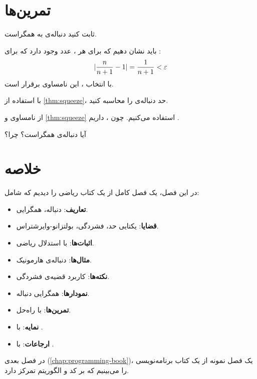 \section{تمرین‌ها}
\label{sec:math-book-exercises}

\begin{exercise}
    ثابت کنید دنباله‌ی 
    به  همگراست.
    \label{exc:convergence-n-over-n1}
\end{exercise}

\begin{solution}
    باید نشان دهیم که برای هر
    ، عدد 
    وجود دارد که برای :
    \[
        \lvert\frac{n}{n+1} - 1\rvert = \frac{1}{n+1} < \varepsilon
    \]
    با انتخاب ،
    این نامساوی برقرار است.
\end{solution}

\begin{exercise}
    با استفاده از \cref{thm:squeeze}، حد
    دنباله‌ی  را
    محاسبه کنید.
    \label{exc:squeeze-cos}
\end{exercise}

\begin{solution}
    از نامساوی
    و \cref{thm:squeeze} استفاده می‌کنیم.
    چون ،
    داریم .
\end{solution}

\begin{exercise}
    آیا دنباله‌ی  همگراست؟
    چرا؟
    \label{exc:alternating}
\end{exercise}

\section{خلاصه}
\label{sec:math-book-summary}

در این فصل، یک فصل کامل از یک کتاب ریاضی
را دیدیم که شامل:

\begin{itemize}
    \item \textbf{تعاریف}: دنباله، همگرایی.
    \item \textbf{قضایا}: یکتایی حد، فشردگی،
    بولتزانو-وایرشتراس.
    \item \textbf{اثبات‌ها}: با استدلال ریاضی.
    \item \textbf{مثال‌ها}: دنباله‌ی هارمونیک.
    \item \textbf{نکته‌ها}: کاربرد قضیه‌ی
    فشردگی.
    \item \textbf{نمودارها}: همگرایی دنباله.
    \item \textbf{تمرین‌ها}: با راه‌حل.
    \item \textbf{نمایه}: با .
    \item \textbf{ارجاعات}: با .
\end{itemize}


در فصل بعدی (\cref{chap:programming-book})،
یک فصل نمونه از یک کتاب برنامه‌نویسی را
می‌بینیم که بر کد و الگوریتم تمرکز دارد.